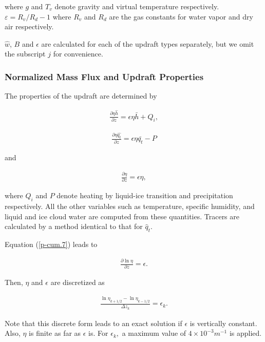 where \(g\) and \(T_v\) denote gravity and virtual temperature respectively. \(\varepsilon = R_v/R_d - 1\) where \(R_v\) and \(R_d\) are the gas constants for water vapor and dry air respectively.

\(\hat{w}\), \(B\) and \(\epsilon\) are calculated for each of the updraft types separately, but we omit the subscript \(j\) for convenience.

\hypertarget{normalized-mass-flux-and-updraft-properties}{%
\subsubsection{Normalized Mass Flux and Updraft Properties}\label{normalized-mass-flux-and-updraft-properties}}

The properties of the updraft are determined by

\begin{eqnarray}
 \frac{\partial \eta \hat{h}}{\partial z} = \epsilon \eta \bar{h} + Q_i, \label{p-cum.5}
\end{eqnarray}

\begin{eqnarray}
 \frac{\partial \eta \hat{q_t}}{\partial z} = \epsilon \eta \bar{q_t} - P \label{p-cum.6}
\end{eqnarray}

and

\begin{eqnarray}
 \frac{\partial \eta}{\partial z} = \epsilon \eta, \label{p-cum.7}
\end{eqnarray}

where \(Q_i\) and \(P\) denote heating by liquid-ice transition and precipitation respectively. All the other variables such as temperature, specific humidity, and liquid and ice cloud water are
computed from these quantities. Tracers are calculated by a method identical to that for \(\hat{q}_t\).

Equation (\ref{p-cum.7}) leads to

\begin{eqnarray}
 \frac{\partial \ln \eta}{\partial z} = \epsilon.
\end{eqnarray}

Then, \(\eta\) and \(\epsilon\) are discretized as

\begin{eqnarray}
 \frac{\ln \eta_{k+1/2} - \ln \eta_{k-1/2}}{\Delta z_k} = \epsilon_k. \label{p-cum.A1}
\end{eqnarray}

Note that this discrete form leads to an exact solution if \(\epsilon\) is vertically constant. Also, \(\eta\) is finite as far as \(\epsilon\) is. For \(\epsilon_k,\) a maximum value of
\(4 \times 10^{-3} m^{-1}\) is applied.

